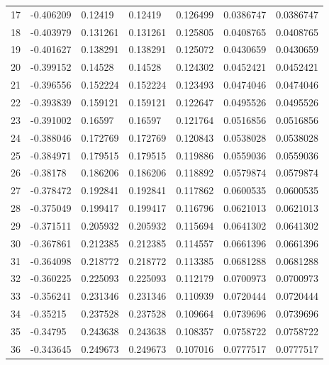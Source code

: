 \begin{longtable}{l|lll|lll}
  17 & -0.406209    & 0.12419     & 0.12419     &  0.126499    & 0.0386747   & 0.0386747   \\
  18 & -0.403979    & 0.131261    & 0.131261    &  0.125805    & 0.0408765   & 0.0408765   \\
  19 & -0.401627    & 0.138291    & 0.138291    &  0.125072    & 0.0430659   & 0.0430659   \\
  20 & -0.399152    & 0.14528     & 0.14528     &  0.124302    & 0.0452421   & 0.0452421   \\
  21 & -0.396556    & 0.152224    & 0.152224    &  0.123493    & 0.0474046   & 0.0474046   \\
  22 & -0.393839    & 0.159121    & 0.159121    &  0.122647    & 0.0495526   & 0.0495526   \\
  23 & -0.391002    & 0.16597     & 0.16597     &  0.121764    & 0.0516856   & 0.0516856   \\
  24 & -0.388046    & 0.172769    & 0.172769    &  0.120843    & 0.0538028   & 0.0538028   \\
  25 & -0.384971    & 0.179515    & 0.179515    &  0.119886    & 0.0559036   & 0.0559036   \\
  26 & -0.38178     & 0.186206    & 0.186206    &  0.118892    & 0.0579874   & 0.0579874   \\
  27 & -0.378472    & 0.192841    & 0.192841    &  0.117862    & 0.0600535   & 0.0600535   \\
  28 & -0.375049    & 0.199417    & 0.199417    &  0.116796    & 0.0621013   & 0.0621013   \\
  29 & -0.371511    & 0.205932    & 0.205932    &  0.115694    & 0.0641302   & 0.0641302   \\
  30 & -0.367861    & 0.212385    & 0.212385    &  0.114557    & 0.0661396   & 0.0661396   \\
  31 & -0.364098    & 0.218772    & 0.218772    &  0.113385    & 0.0681288   & 0.0681288   \\
  32 & -0.360225    & 0.225093    & 0.225093    &  0.112179    & 0.0700973   & 0.0700973   \\
  33 & -0.356241    & 0.231346    & 0.231346    &  0.110939    & 0.0720444   & 0.0720444   \\
  34 & -0.35215     & 0.237528    & 0.237528    &  0.109664    & 0.0739696   & 0.0739696   \\
  35 & -0.34795     & 0.243638    & 0.243638    &  0.108357    & 0.0758722   & 0.0758722   \\
  36 & -0.343645    & 0.249673    & 0.249673    &  0.107016    & 0.0777517   & 0.0777517   \\

\end{longtable}
